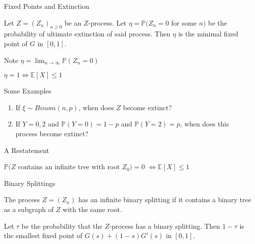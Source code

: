 \documentclass{beamer}
\begin{document}
\begin{frame}{Fixed Points and Extinction}
\begin{theorem}
Let $Z = (Z_n)_{n \ge 0}$ be an $Z$-process. Let $\eta = \mathbb{P}(Z_n = 0$ for some $n)$ be the probability of ultimate extinction of said process. Then $\eta$ is the minimal fixed point of  $G$  in $[0,1]$.
\end{theorem}

\vspace{10mm}
Note $\eta = \lim_{n \to \infty} \mathbb{P}(Z_n = 0)$

\vspace{10 mm}
\pause
\begin{theorem}
$\eta = 1 \iff \mathbb{E}[X] \le 1$
\end{theorem}
\end{frame}

\begin{frame}{Some Examples}
\begin{enumerate}
\item If $\xi \sim Binom(n,p)$, when does $Z$ become extinct?

\vspace{10 mm}
\pause
\item If $Y = 0,2$ and $\mathbb{P}(Y = 0) = 1 - p$ and $\mathbb{P}(Y = 2) = p$, when does this process become extinct?
\end{enumerate}
\end{frame}

\begin{frame}{A Restatement}
\begin{theorem}
$\mathbb{P}(Z$ contains an infinite tree with root $Z_0) = 0$ $\iff \mathbb{E}[X] \le 1$
\end{theorem}
\end{frame}

\begin{frame}{Binary Splittings}
\begin{definition}
The process $Z = (Z_n)$ has an infinite binary splitting if it contains a binary tree as a subgraph of $Z$ with the same root.
\end{definition}

\pause
\vspace{10 mm}
\begin{theorem}
Let $\tau$ be the probability that the $Z$-process has a binary splitting. Then $1 - \tau$ is the smallest fixed point of $G(s) + (1-s)G'(s)$ in $[0,1]$.
\end{theorem}
\end{frame}
\end{document}
